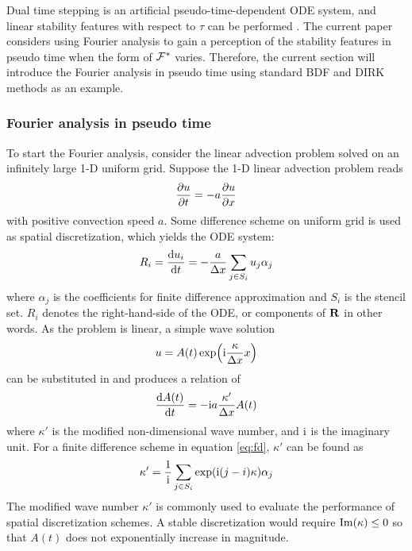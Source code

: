 Dual time stepping  is an artificial
pseudo-time-dependent ODE system, and linear stability features with
respect to $\tau$ can be performed \cite{jameson1991time}.
The current paper considers using Fourier analysis
to gain a perception of the stability features in pseudo time
when the form of $\mathcal{F}^*$ varies.
Therefore, the current section will introduce the
Fourier analysis in pseudo time using standard BDF and DIRK
methods as an example.


\subsubsection{Fourier analysis in pseudo time}
\label{sssec:fourier}



To start the Fourier analysis, consider the linear advection problem
solved on an infinitely large 1-D uniform
grid.
Suppose the 1-D linear advection problem reads
\begin{equation}
    \partialderivative{u}{t} = -a \partialderivative{u}{x}
\end{equation}
with positive convection speed $a$.
Some difference scheme on uniform grid is used as spatial  discretization, which
yields the ODE system:
\begin{equation}
    R_i=\derivative{u_i}{t} = -\frac{a}{\inc x} \sum_{j\in S_i}u_j\alpha_j
    \label{eq:fd}
\end{equation}
where $\alpha_j$ is the coefficients for finite difference approximation
and $S_i$ is the stencil set. $R_i$ denotes the right-hand-side of the ODE,
or components of $\mathbf{R}$ in other words.
As the problem is linear,
a simple wave solution
\begin{equation}
    u = A(t)\exp(\mathrm{i} \frac{\kappa}{{\Delta} x} x)
\end{equation}
can be substituted in and produces
a relation of
\begin{equation}
    \frac{\dd A(t)}{\dd t} = -\mathrm{i} a\frac{\kappa'}{{\Delta} x}  A(t)
\end{equation}
where $\kappa'$ is the modified non-dimensional wave number,
and $\mathrm{i}$ is the imaginary unit.
For a finite difference scheme in equation \eqref{eq:fd},
$\kappa'$ can be found as
\begin{equation}
    \kappa' = \frac{1}{\mathrm{i}} \sum_{j\in S_i}\exp(\mathrm{i} (j-i)\kappa)\alpha_j
\end{equation}
The modified wave number $\kappa'$ is commonly used to evaluate the performance of
spatial  discretization schemes.
A stable discretization would require $\mathrm{Im}(\kappa) \leq 0$ so that
$A(t)$ does not exponentially increase in magnitude.

